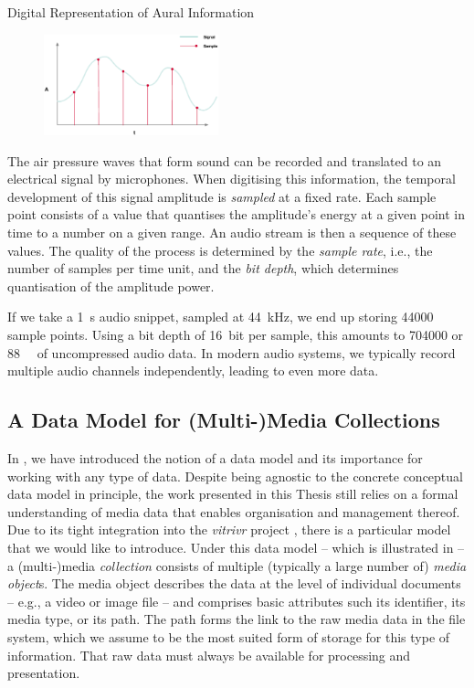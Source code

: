 \begin{example}[label=example:representation_audio_information]{Digital Representation of Aural Information}{}
    \begin{figure}
        \includegraphics[width=0.45\textwidth]{figures/example-audio-signal.eps}
    \end{figure}
    The air pressure waves that form sound can be recorded and translated to an electrical signal by microphones. When digitising this information, the temporal development of this signal amplitude is \emph{sampled} at a fixed rate. Each sample point consists of a value that quantises the amplitude's energy at a given point in time to a number on a given range. An audio stream is then a sequence of these values. The quality of the process is determined by the \emph{sample rate}, i.e., the number of samples per time unit, and the \emph{bit depth}, which determines quantisation of the amplitude power.

    If we take a \SI{1}{\second} audio snippet, sampled at \SI{44}{\kilo\hertz}, we end up storing \num{44000} sample points. Using a bit depth of \SI{16}{bit} per sample, this amounts to \SI{704000}{\bit} or \SI{88}{\kilo\byte} of uncompressed audio data. In modern audio systems, we typically record multiple audio channels independently, leading to even more data.
\end{example}

\subsection{A Data Model for (Multi-)Media Collections}
\label{section:media_data_model}
In , we have introduced the notion of a data model and its importance for working with any type of data. Despite being agnostic to the concrete conceptual data model in principle, the work presented in this Thesis still relies on a formal understanding of media data that enables organisation and management thereof. Due to its tight integration into the \emph{vitrivr} project \cite{Rossetto:2016Vitrivr,Gasser:2019Multimodal,Heller:2020Multi}, there is a particular model that we would like to introduce. Under this data model -- which is illustrated in  -- a (multi-)media \emph{collection} consists of multiple (typically a large number of) \emph{media object}s. The media object describes the data at the level of individual documents -- e.g., a video or image file -- and comprises basic attributes such its identifier, its media type, or its path. The path forms the link to the raw media data in the file system, which we assume to be the most suited form of storage for this type of information. That raw data must always be available for processing and presentation.

